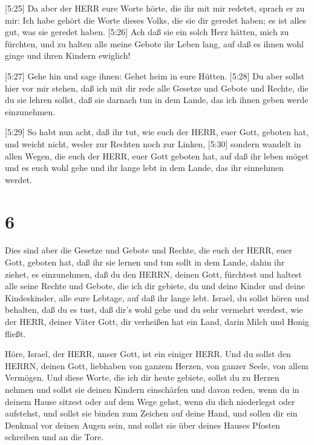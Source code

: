  {[}5:25{]} Da aber der HERR eure Worte hörte, die ihr mit
mir redetet, sprach er zu mir: Ich habe gehört die Worte dieses Volks,
die sie dir geredet haben; es ist alles gut, was sie geredet haben.
 {[}5:26{]} Ach daß sie ein solch Herz hätten, mich zu
fürchten, und zu halten alle meine Gebote ihr Leben lang, auf daß es
ihnen wohl ginge und ihren Kindern ewiglich!

 {[}5:27{]} Gehe hin und sage ihnen: Gehet heim in eure
Hütten.  {[}5:28{]} Du aber sollst hier vor mir stehen, daß
ich mit dir rede alle Gesetze und Gebote und Rechte, die du sie lehren
sollst, daß sie darnach tun in dem Lande, das ich ihnen geben werde
einzunehmen.

 {[}5:29{]} So habt nun acht, daß ihr tut, wie euch der
HERR, euer Gott, geboten hat, und weicht nicht, weder zur Rechten noch
zur Linken,  {[}5:30{]} sondern wandelt in allen Wegen, die
euch der HERR, euer Gott geboten hat, auf daß ihr leben möget und es
euch wohl gehe und ihr lange lebt in dem Lande, das ihr einnehmen
werdet.

\hypertarget{section-5}{%
\section{6}\label{section-5}}

 Dies sind aber die Gesetze und Gebote und Rechte, die euch
der HERR, euer Gott, geboten hat, daß ihr sie lernen und tun sollt in
dem Lande, dahin ihr ziehet, es einzunehmen,  daß du den
HERRN, deinen Gott, fürchtest und haltest alle seine Rechte und Gebote,
die ich dir gebiete, du und deine Kinder und deine Kindeskinder, alle
eure Lebtage, auf daß ihr lange lebt.  Israel, du sollst
hören und behalten, daß du es tust, daß dir's wohl gehe und du sehr
vermehrt werdest, wie der HERR, deiner Väter Gott, dir verheißen hat ein
Land, darin Milch und Honig fließt.

 Höre, Israel, der HERR, unser Gott, ist ein einiger HERR.
 Und du sollst den HERRN, deinen Gott, liebhaben von ganzem
Herzen, von ganzer Seele, von allem Vermögen.  Und diese
Worte, die ich dir heute gebiete, sollst du zu Herzen nehmen
 und sollst sie deinen Kindern einschärfen und davon reden,
wenn du in deinem Hause sitzest oder auf dem Wege gehst, wenn du dich
niederlegst oder aufstehst,  und sollst sie binden zum
Zeichen auf deine Hand, und sollen dir ein Denkmal vor deinen Augen
sein,  und sollst sie über deines Hauses Pfosten schreiben
und an die Tore.


